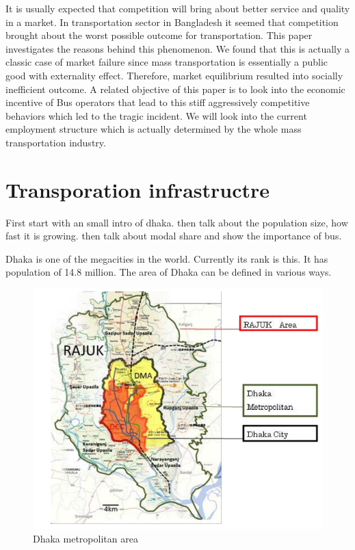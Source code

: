 \documentclass[
  11pt,
]{article}
\begin{document}
It is usually expected that competition will bring about better service
and quality in a market. In transportation sector in Bangladesh it
seemed that competition brought about the worst possible outcome for
transportation. This paper investigates the reasons behind this
phenomenon. We found that this is actually a classic case of market
failure since mass transportation is essentially a public good with
externality effect. Therefore, market equilibrium resulted into socially
inefficient outcome. A related objective of this paper is to look into
the economic incentive of Bus operators that lead to this stiff
aggressively competitive behaviors which led to the tragic incident. We
will look into the current employment structure which is actually
determined by the whole mass transportation industry.

\hypertarget{transporation-infrastructre}{%
\section{Transporation
infrastructre}\label{transporation-infrastructre}}

First start with an small intro of dhaka. then talk about the population
size, how fast it is growing. then talk about modal share and show the
importance of bus.

Dhaka is one of the megacities in the world. Currently its rank is this.
It has population of 14.8 million. The area of Dhaka can be defined in
various ways.

\begin{figure}  
 \begin{center}
    \includegraphics{./figures/dma.png}  
  \caption{Dhaka metropolitan area} 
\end{center}
\end{figure}
\end{document}
